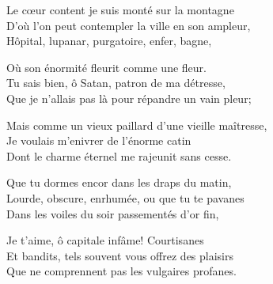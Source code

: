 \bigskip

\noindent Le cœur content je suis monté sur la montagne\\
D'où l'on peut contempler la ville en son ampleur,\\
Hôpital, lupanar, purgatoire, enfer, bagne,\\\medskip

 \noindent Où son énormité fleurit comme une fleur.\\
Tu sais bien, ô Satan, patron de ma détresse,\\
Que je n'allais pas là pour répandre un vain pleur;\\\medskip

 \noindent Mais comme un vieux paillard d'une vieille maîtresse,\\
Je voulais m'enivrer de l'énorme catin\\
Dont le charme éternel me rajeunit sans cesse.\\\medskip

 \noindent Que tu dormes encor dans les draps du matin,\\
Lourde, obscure, enrhumée, ou que tu te pavanes\\
Dans les voiles du soir passementés d'or fin,\\\medskip

 \noindent Je t'aime, ô capitale infâme! Courtisanes\\
Et bandits, tels souvent vous offrez des plaisirs\\
Que ne comprennent pas les vulgaires profanes.\\
\vfil

\setcounter{secnumdepth}{0} %
